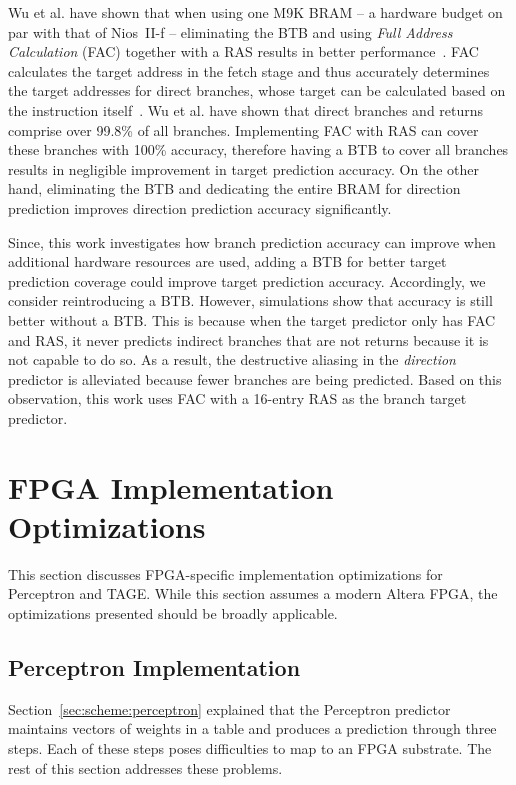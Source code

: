 \documentclass[conference]{IEEEtran}
\begin{document}
Wu et al. have shown that when using  one  M9K BRAM -- a hardware budget on par with that of Nios~II-f -- eliminating the BTB and using \textit{Full Address Calculation} (FAC) together with a RAS results in better performance~\cite{grselect}. FAC  calculates the target address in the fetch stage and thus accurately determines the target addresses for direct branches, whose target can be calculated based on the instruction itself~\cite{niosii}. Wu et al. have shown that direct branches and returns comprise over 99.8\% of all branches. Implementing FAC with RAS can cover these branches with 100\% accuracy, therefore having a BTB to cover all branches results in negligible improvement in target prediction accuracy. On the other hand, eliminating the BTB and dedicating the entire BRAM for direction prediction improves direction prediction accuracy significantly.

Since, this work investigates how branch prediction accuracy can improve when additional hardware resources are used,  adding a BTB for better target prediction coverage could improve target prediction accuracy. Accordingly, we consider reintroducing a BTB. However, simulations show that  accuracy is still better without a BTB. This is because when the target predictor only has FAC and RAS, it never predicts indirect branches that are not returns because it is not capable to do so. As a result, the destructive aliasing in the \textit{direction} predictor is alleviated because fewer branches are being predicted. Based on this observation, this work uses FAC with a 16-entry RAS as the branch target predictor.


\section{FPGA Implementation Optimizations}
\label{sec:fpga}
This section discusses FPGA-specific implementation optimizations for Perceptron and TAGE. While this section assumes a modern Altera FPGA, the optimizations presented should be broadly applicable.

\subsection{Perceptron Implementation}
\label{sec:fpga:perceptron}

Section~\ref{sec:scheme:perceptron} explained that the Perceptron predictor maintains vectors of weights in a table and produces a prediction through three steps. Each of these steps poses difficulties to map to an FPGA substrate. The rest of this section addresses these problems.
\end{document}
